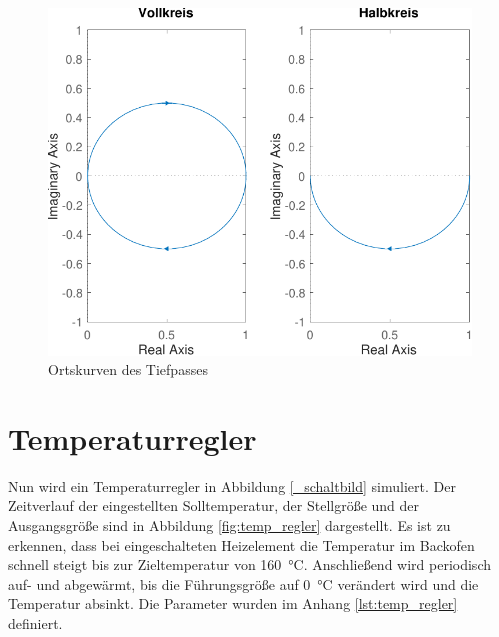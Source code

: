 \documentclass[
    paper=a4,
    fontsize=10pt,
    DIV=13,
    oneside,
]{scrartcl}
\begin{document}
    \begin{figure}
        \centering
        \includegraphics[width=\imagewidth]{../versuch1/ortskurve.pdf}
        \caption{Ortskurven des Tiefpasses}
        \label{fig:ortskurve}
    \end{figure}

\section{Temperaturregler}
    Nun wird ein Temperaturregler in Abbildung \ref{_schaltbild} simuliert. Der Zeitverlauf der eingestellten Solltemperatur, der Stellgröße und der Ausgangsgröße sind in Abbildung \ref{fig:temp_regler} dargestellt. Es ist zu erkennen, dass bei eingeschalteten Heizelement die Temperatur im Backofen schnell steigt bis zur Zieltemperatur von \SI{160}{\celsius}. Anschließend wird periodisch auf- und abgewärmt, bis die Führungsgröße auf \SI{0}{\celsius} verändert wird und die Temperatur absinkt. Die Parameter wurden im Anhang \ref{lst:temp_regler} definiert.
\end{document}

